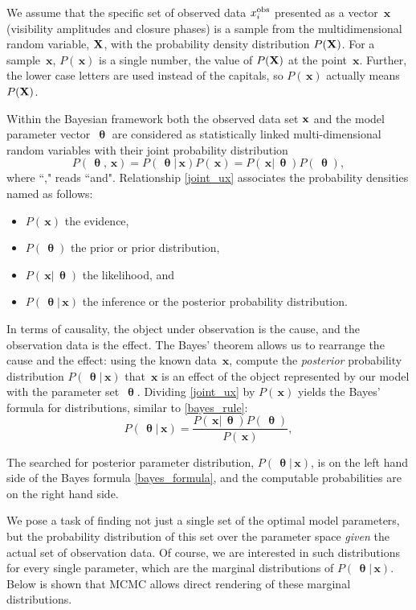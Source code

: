 \documentclass[preprint2]{aastex}
\newcommand{\bfx}{\,\mathbf{x}}
\newcommand{\bfth}{\,\bm{\uptheta}}
\begin{document}
We assume that the specific set of observed data $x_i^{\rm obs}$ presented as a vector $\bfx$ (visibility amplitudes and closure phases) is a sample from the multidimensional random variable, ${\bf X}$, with the probability density distribution $P({\bf X})$. For a sample $\bfx$, $P(\bfx)$ is a single number, the value of $P({\bf X})$ at the point $\bfx$. Further, the lower case letters are used instead of the capitals, so $P(\bfx)$ actually means $P({\bf X})$.

Within the Bayesian framework both the observed data set $\bf{x}$ and the model parameter vector $\bfth$ are considered as statistically linked multi-dimensional random variables with their joint probability distribution
\begin{equation}
  \label{joint_ux}
  P(\bfth,\bfx) =  P(\bfth|\bfx)P(\bfx) = P(\bfx|\bfth)P(\bfth),
\end{equation}
where ``," reads ``and". Relationship \eqref{joint_ux} associates the probability densities named as follows:
\begin{itemize}
  \item[-] $P(\bfx)$ the evidence,
  \item[-] $P(\bfth)$ the prior or prior distribution,
  \item[-] $P(\bfx|\bfth)$ the likelihood, and
  \item[-] $P(\bfth|\bfx)$ the inference or the posterior probability distribution.
\end{itemize}
In terms of causality, the object under observation is the cause, and the observation data is the effect. The Bayes' theorem allows us to rearrange the cause and the effect: using the known data $\bfx$, compute the \emph{posterior} probability distribution $P(\bfth|\bfx)$ that $\bfx$ is an effect of the object represented by our model with the parameter set $\bfth$. 
Dividing \eqref{joint_ux} by $P(\bfx)$ yields the Bayes' formula for distributions, similar to \eqref{bayes_rule}:
\begin{equation}
  \label{bayes_formula}
  P(\bfth|\bfx) =  \frac{P(\bfx|\bfth)P(\bfth)}{P(\bfx)},
\end{equation}

The searched for posterior parameter distribution, $P(\bfth|\bfx)$, is on the left hand side of the Bayes formula \eqref{bayes_formula}, and the computable probabilities are on the right hand side. 

We pose a task of finding not just a single set of the optimal model parameters, but the probability distribution of this set over the parameter space \emph{given} the actual set of observation data. Of course, we are interested in such distributions for every single parameter, which are the marginal distributions of $P(\bfth|\bfx)$. Below is shown that MCMC allows direct rendering of these marginal distributions. 
\end{document}
